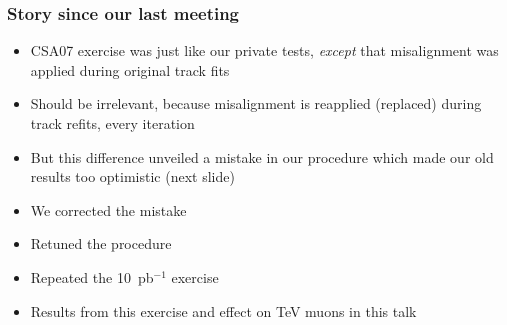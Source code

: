 \documentclass[compress]{beamer}
\begin{document}
\begin{frame}
\frametitle{Story since our last meeting}

\begin{itemize}\setlength{\itemsep}{0.25 cm}
\item CSA07 exercise was just like our private tests, {\it except}
that misalignment was applied during original track fits
\item Should be irrelevant, because misalignment is reapplied (replaced)
during track refits, every iteration
\item But this difference unveiled a mistake in our procedure which
made our old results too optimistic (next slide)
\item We corrected the mistake
\item Retuned the procedure
\item Repeated the 10~pb$^{-1}$ exercise
\item Results from this exercise and effect on TeV muons in this talk
\end{itemize}
\end{frame}
\end{document}
